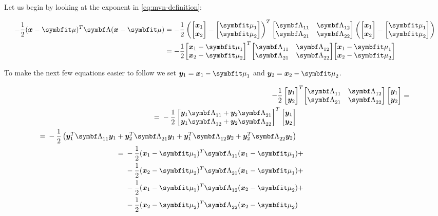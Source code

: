 Let us begin by looking at the exponent in \autoref{eq:mvn-definition}:

\begin{align}
  -\frac{1}{2} (\vx - \vmu)^T \mLambda (\vx - \vmu) &=
  -\frac{1}{2} \left(\partx - \partmu \right)^T \partlambda \left(\partx - \partmu \right) \\
                                                    &= -\frac{1}{2} \partxmu^T \partlambda \partxmu
\end{align}

To make the next few equations easier to follow we set $\vy_1 = \vx_1 - \vmu_1$ and $\vy_2 = \vx_2 - \vmu_2$.

\begin{align}
    -\frac{1}{2} \begin{bmatrix} \vy_1 \\ \vy_2 \end{bmatrix} ^T & \partlambda \begin{bmatrix} \vy_1 \\ \vy_2 \end{bmatrix} = \\
  \begin{split}
    ={}& -\frac{1}{2} \begin{bmatrix} \vy_1 \ml{11} + \vy_2 \ml{21} \\ \vy_1 \ml{12} + \vy_2 \ml{22} \end{bmatrix} ^T \begin{bmatrix} \vy_1 \\ \vy_2 \end{bmatrix}
  \end{split} \\
  \begin{split}
    ={}& -\frac{1}{2} \left( \vy_1^T \ml{11} \vy_1 + \vy_2^T \ml{21} \vy_1 + \vy_1^T \ml{12} \vy_2 + \vy_2^T \ml{22} \vy_2 \right)
  \end{split} \\
  \begin{split}
    ={}& -\frac{1}{2} (\vx_1 - \vmu_1)^T \ml{11} (\vx_1 - \vmu_1) {}+ \\
       &-\frac{1}{2} (\vx_2 - \vmu_2)^T \ml{21} (\vx_1 - \vmu_1) {}+ \\
       &-\frac{1}{2} (\vx_1 - \vmu_1)^T \ml{12} (\vx_2 - \vmu_2) {}+ \\
       &-\frac{1}{2} (\vx_2 - \vmu_2)^T \ml{22} (\vx_2 - \vmu_2) \label{eq:mvn-quadratic-form}
  \end{split}
\end{align}

